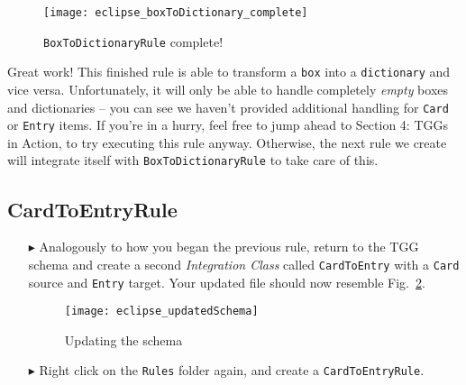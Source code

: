\begin{figure}[htbp]
\begin{center}
  \texttt{[image: eclipse\_boxToDictionary\_complete]}
  \caption{\texttt{BoxToDictionaryRule} complete!}
  \label{fig:allReferences}
\end{center}
\end{figure}

\clearpage

Great work! This finished rule is able to transform a \texttt{box} into a \texttt{dictionary} and vice versa. Unfortunately, it will only be able to handle
completely \emph{empty} boxes and dictionaries -- you can see we haven't provided additional handling for \texttt{Card} or \texttt{Entry} items. If you're in a
hurry, feel free to jump ahead to Section 4: TGGs in Action, to try executing this rule anyway. Otherwise, the next rule we create will integrate itself with
\texttt{BoxToDictionaryRule} to take care of this.

\subsection{CardToEntryRule}

\begin{itemize} 

\item[$\blacktriangleright$] Analogously to how you began the previous rule, return to the TGG schema and create a second \emph{Integration Class} called
\texttt{CardToEntry} with a \texttt{Card} source and \texttt{Entry} target. Your updated file should now resemble Fig.~\ref{fig:updatedSchema}.

\vspace{0.5cm}

\begin{figure}[htbp]
\begin{center}
  \texttt{[image: eclipse\_updatedSchema]}
  \caption{Updating the schema}
  \label{fig:updatedSchema}
\end{center}
\end{figure}

\item[$\blacktriangleright$] Right click on the \texttt{Rules} folder again, and create a \texttt{CardToEntryRule}.

\end{itemize}

